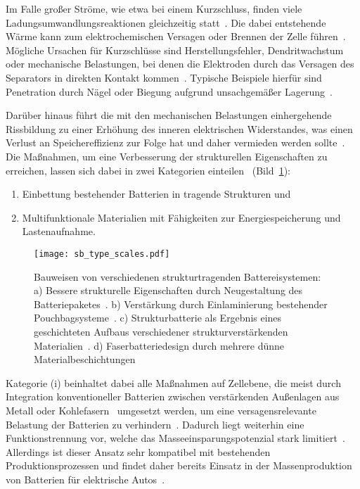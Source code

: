 Im Falle großer Ströme, wie etwa bei einem Kurzschluss, finden viele Ladungsumwandlungsreaktionen gleichzeitig statt~\cite{Berg2022}. Die dabei entstehende Wärme kann zum elektrochemischen Versagen oder Brennen der Zelle führen~\cite{Wang2019a}. Mögliche Ursachen für Kurzschlüsse sind Herstellungsfehler, Dendritwachstum oder mechanische Belastungen, bei denen die Elektroden durch das Versagen des Separators in direkten Kontakt kommen~\cite{Kaliaperumal2021,Berg2022}. Typische Beispiele hierfür sind Penetration durch Nägel oder Biegung aufgrund unsachgemäßer Lagerung~\cite{Beard2019}.

Darüber hinaus führt die mit den mechanischen Belastungen einhergehende Rissbildung zu einer Erhöhung des inneren elektrischen Widerstandes, was einen Verlust an Speichereffizienz zur Folge hat und daher vermieden werden sollte~\cite{Plett2024}. Die Maßnahmen, um eine Verbesserung der strukturellen Eigenschaften zu erreichen, lassen sich dabei in zwei Kategorien einteilen~\cite{Jin2023} (Bild~\ref{fig:sb_type_scales}):
\begin{enumerate}[label=(\roman*)]
	\item Einbettung bestehender Batterien in tragende Strukturen und
	\item Multifunktionale Materialien mit Fähigkeiten zur Energiespeicherung und Lastenaufnahme.
\end{enumerate}
\begin{figure}[!h]
        \center
		\texttt{[image: sb\_type\_scales.pdf]}
		\caption{\label{fig:sb_type_scales}Bauweisen von verschiedenen strukturtragenden Battereisystemen: a) Bessere strukturelle Eigenschaften durch Neugestaltung des Batteriepaketes~\cite{Tesla2020}. b) Verstärkung durch Einlaminierung bestehender Pouchbagsysteme~\cite{Pattarakunnan2020}. c) Strukturbatterie als Ergebnis eines geschichteten Aufbaus verschiedener strukturverstärkenden Materialien~\cite{Asp2015}. d) Faserbatteriedesign durch mehrere dünne Materialbeschichtungen~\cite{Thakur2020}}
\end{figure}

Kategorie (i) beinhaltet dabei alle Maßnahmen auf Zellebene, die meist durch Integration konventioneller Batterien zwischen verstärkenden Außenlagen aus Metall oder Kohlefasern~\cite{Galos2020,Attar2020} umgesetzt werden, um eine versagensrelevante Belastung der Batterien zu verhindern~\cite{Beard2019}. Dadurch liegt weiterhin eine Funktionstrennung vor, welche das Masseeinsparungspotenzial stark limitiert~\cite{Jin2023}. Allerdings ist dieser Ansatz sehr kompatibel mit bestehenden Produktionsprozessen und findet daher bereits Einsatz in der Massenproduktion von Batterien für elektrische Autos~\cite{Tesla2020}.

